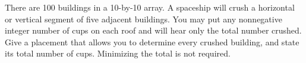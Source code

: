 There are 100 buildings in a 10-by-10 array. A spaceship will crush a horizontal or vertical segment of five adjacent buildings. You may put any nonnegative integer number of cups on each roof and will hear only the total number crushed. Give a placement that allows you to determine every crushed building, and state its total number of cups. Minimizing the total is not required.
